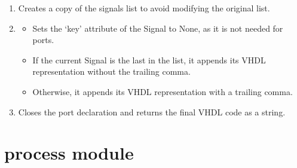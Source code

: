 \documentclass[letterpaper,10pt,english]{sphinxmanual}
\begin{document}
\begin{fulllineitems}
\begin{fulllineitems}
\begin{description}
\begin{enumerate}
\item {} 
\sphinxAtStartPar
Creates a copy of the signals list to avoid modifying the original list.

\item {} \begin{description}
\begin{itemize}
\item {} 
\sphinxAtStartPar
Sets the ‘key’ attribute of the Signal to None, as it is not needed for ports.

\item {} 
\sphinxAtStartPar
If the current Signal is the last in the list, it appends its VHDL representation without the trailing comma.

\item {} 
\sphinxAtStartPar
Otherwise, it appends its VHDL representation with a trailing comma.

\end{itemize}

\end{description}

\item {} 
\sphinxAtStartPar
Closes the port declaration and returns the final VHDL code as a string.

\end{enumerate}

\end{description}

\end{fulllineitems}


\end{fulllineitems}


\sphinxstepscope


\section{process module}
\label{\detokenize{process:module-process}}\label{\detokenize{process:process-module}}\label{\detokenize{process::doc}}
\end{document}
